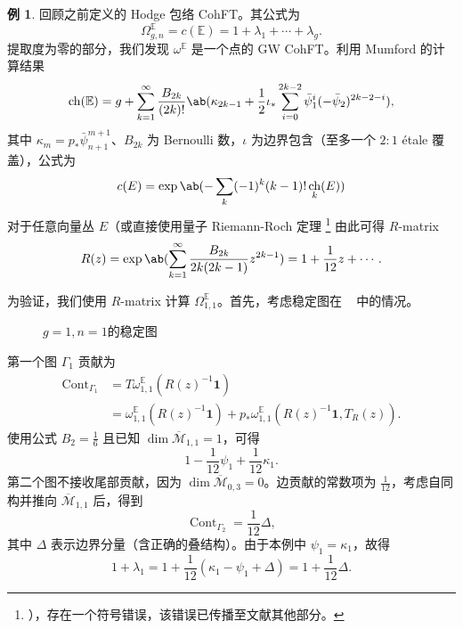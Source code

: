 \documentclass{amsart}
\theoremstyle{definition}
\newtheorem{exm}[thm]{例}
\theoremstyle{remark}
\theoremstyle{plain}
\theoremstyle{definition}
\theoremstyle{remark}
\newcommand{\E}{\mathbb{E}}
\newcommand{\Mbar}{\overline{\mathcal{M}}}
\newcommand{\1}{\mathbf{1}}
\newcommand{\2}{\mathbf{2}}
\newcommand{\3}{\mathbf{3}}
\DeclareMathOperator{\ch}{ch}
\DeclareMathOperator{\Cont}{Cont}
\begin{document}
\begin{exm}
回顾之前定义的 Hodge 包络 CohFT。其公式为
    \[ \Omega^{\E}_{g,n} = c(\E) = 1 + \lambda_1 + \cdots + \lambda_g. \]
    提取度为零的部分，我们发现 $\omega^{\E}$ 是一个点的 GW CohFT。利用 Mumford 的计算结果
    \[ \ch(\E) = g + \sum_{k=1}^{\infty} \frac{B_{2k}}{(2k)!}\ab(\kappa_{2k-1} + \frac{1}{2}\iota_*\sum_{i=0}^{2k-2} \bar{\psi}_1^{i} (-\bar{\psi}_2)^{2k-2-i}), \]
其中 $\kappa_{m} = p_* \bar{\psi}_{n+1}^{m+1}$、$B_{2k}$ 为 Bernoulli 数，$\iota$ 为边界包含（至多一个 $2:1$ \'etale 覆盖），公式为
    \[ c(E) = \exp \ab(-\sum_k (-1)^k (k-1)!\ch_k(E)) \]
对于任意向量丛 $E$（或直接使用量子 Riemann-Roch 定理 \footnote{），存在一个符号错误，该错误已传播至文献其他部分。} 由此可得 $R$-matrix
    \[ R(z) = \exp\ab( \sum_{k=1}^{\infty} \frac{B_{2k}}{2k(2k-1)} z^{2k-1}) = 1+\frac{1}{12}z + \cdots. \]

为验证，我们使用 $R$-matrix 计算 $\Omega_{1,1}^{\E}$。首先，考虑稳定图在 ~ 中的情况。
    \begin{figure}[htpb]
    \begin{center}
    \end{center}
    \caption{$g=1, n=1$的稳定图}%
    \label{fig:03graphloop}
    \end{figure}
第一个图 $\Gamma_1$ 贡献为
    \begin{align*}
        \Cont_{\Gamma_1} &= T\omega_{1,1}^{\E}(R(z)^{-1}\1) \\
        &= \omega_{1,1}^{\E}(R(z)^{-1}\1) + p_* \omega_{1,1}^{\E}(R(z)^{-1}\1, T_R(z)).
    \end{align*}
使用公式 $B_2 = \frac{1}{6}$ 且已知 $\dim \Mbar_{1,1} = 1$，可得
    \[ 1 - \frac{1}{12}\psi_1 + \frac{1}{12} \kappa_1. \]
第二个图不接收尾部贡献，因为 $\dim \Mbar_{0,3} = 0$。边贡献的常数项为 $\frac{1}{12}$，考虑自同构并推向 $\Mbar_{1,1}$ 后，得到
    \[ \Cont_{\Gamma_2} = \frac{1}{12} \Delta, \]
其中 $\Delta$ 表示边界分量（含正确的叠结构）。由于本例中 $\psi_1 = \kappa_1$，故得
    \[ 1+\lambda_1 = 1 + \frac{1}{12}(\kappa_1 - \psi_1 + \Delta) = 1 + \frac{1}{12} \Delta. \]
\end{exm}
\end{document}
